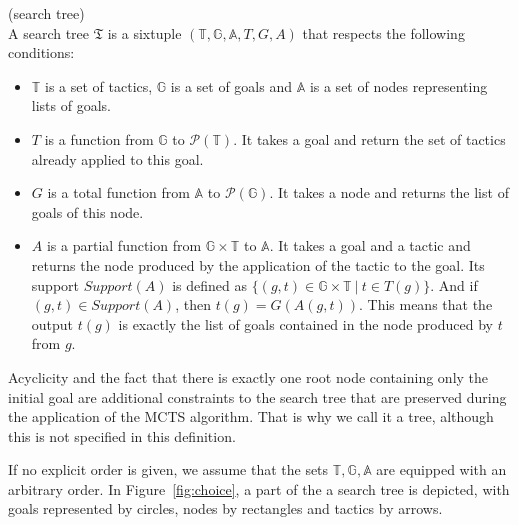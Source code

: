 \documentclass[runningheads,a4paper,draft]{svjour3}
\begin{document}
\begin{definition}\label{def:stree}(search tree)\\
A search tree $\mathfrak{T}$ is a sixtuple
$(\mathbb{T},\mathbb{G},\mathbb{A},T,G,A)$
that respects the following conditions:
\begin{itemize}
\item $\mathbb{T}$ is a set of tactics, $\mathbb{G}$ is a set of goals
 and $\mathbb{A}$ is a set of nodes representing lists of goals.
\item $T$ is a function from $\mathbb{G}$ to $\mathcal{P}(\mathbb{T})$. It
takes a goal and return the set of tactics already applied to this goal.
\item $G$ is a total function from $\mathbb{A}$ to $\mathcal{P}(\mathbb{G})$.
It takes a node and returns the list of goals of this node.
\item $A$ is a partial function from $\mathbb{G} \times \mathbb{T}$ to
$\mathbb{A}$. It takes a goal and a tactic and returns the node produced by the
application of the tactic to the goal. Its support $\mathit{Support}(A)$ is
defined as $\lbrace (g,t) \in \mathbb{G} \times \mathbb{T}\ |\ t \in T(g)
\rbrace$. And if $(g,t) \in \mathit{Support}(A)$, then $t(g) = G(A(g,t))$. This
means that the output $t(g)$ is exactly the list
of goals contained in the node produced by
$t$ from $g$.
\end{itemize}

Acyclicity and the fact that there is exactly
one root node containing only the initial goal are additional constraints to
the search tree that are preserved during the
application of the MCTS algorithm. That is why we call it a tree, although this
is not specified in this definition.
\end{definition}

If no explicit order is given, we assume that the sets
$\mathbb{T},\mathbb{G},\mathbb{A}$ are equipped with an
arbitrary order. In Figure~\ref{fig:choice}, a part of the a search tree is
depicted, with goals represented by circles, nodes by rectangles and tactics by
arrows.
\end{document}
